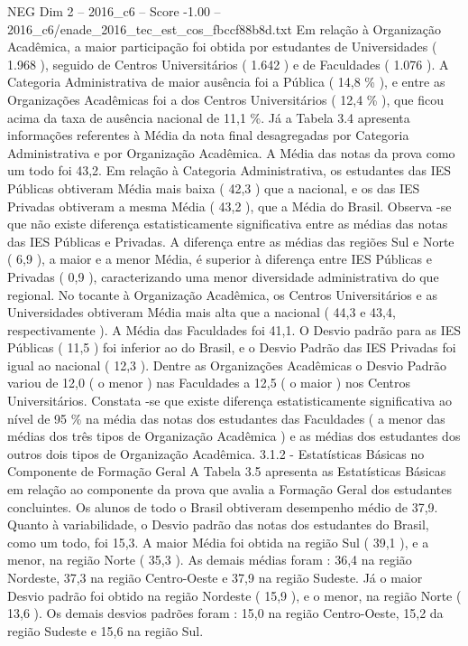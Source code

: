 \begin{textsample}{NEG Dim 2 – 2016\_c6 – Score -1.00 – 2016\_c6/enade\_2016\_tec\_est\_cos\_fbccf88b8d.txt}
Em relação à Organização Acadêmica, a maior participação foi obtida por estudantes de Universidades ( 1.968 ), seguido de Centros Universitários ( 1.642 ) e de Faculdades ( 1.076 ).
A Categoria Administrativa de maior ausência foi a Pública ( 14,8 \% ), e entre as Organizações Acadêmicas foi a dos Centros Universitários ( 12,4 \% ), que ficou acima da taxa de ausência nacional de 11,1 \%.
Já a Tabela 3.4 apresenta informações referentes à Média da nota final desagregadas por Categoria Administrativa e por Organização Acadêmica.
A Média das notas da prova como um todo foi 43,2.
Em relação à Categoria Administrativa, os estudantes das IES Públicas obtiveram Média mais baixa ( 42,3 ) que a nacional, e os das IES Privadas obtiveram a mesma Média ( 43,2 ), que a Média do Brasil.
Observa -se que não existe diferença estatisticamente significativa entre as médias das notas das IES Públicas e Privadas.
A diferença entre as médias das regiões Sul e Norte ( 6,9 ), a maior e a menor Média, é superior à diferença entre IES Públicas e Privadas ( 0,9 ), caracterizando uma menor diversidade administrativa do que regional.
No tocante à Organização Acadêmica, os Centros Universitários e as Universidades obtiveram Média mais alta que a nacional ( 44,3 e 43,4, respectivamente ).
A Média das Faculdades foi 41,1.
O Desvio padrão para as IES Públicas ( 11,5 ) foi inferior ao do Brasil, e o Desvio Padrão das IES Privadas foi igual ao nacional ( 12,3 ).
Dentre as Organizações Acadêmicas o Desvio Padrão variou de 12,0 ( o menor ) nas Faculdades a 12,5 ( o maior ) nos Centros Universitários.
Constata -se que existe diferença estatisticamente significativa ao nível de 95 \% na média das notas dos estudantes das Faculdades ( a menor das médias dos três tipos de Organização Acadêmica ) e as médias dos estudantes dos outros dois tipos de Organização Acadêmica. 3.1.2 - Estatísticas Básicas no Componente de Formação Geral A Tabela 3.5 apresenta as Estatísticas Básicas em relação ao componente da prova que avalia a Formação Geral dos estudantes concluintes.
Os alunos de todo o Brasil obtiveram desempenho médio de 37,9.
Quanto à variabilidade, o Desvio padrão das notas dos estudantes do Brasil, como um todo, foi 15,3.
A maior Média foi obtida na região Sul ( 39,1 ), e a menor, na região Norte ( 35,3 ).
As demais médias foram : 36,4 na região Nordeste, 37,3 na região Centro-Oeste e 37,9 na região Sudeste.
Já o maior Desvio padrão foi obtido na região Nordeste ( 15,9 ), e o menor, na região Norte ( 13,6 ).
Os demais desvios padrões foram : 15,0 na região Centro-Oeste, 15,2 da região Sudeste e 15,6 na região Sul.

\end{textsample}
